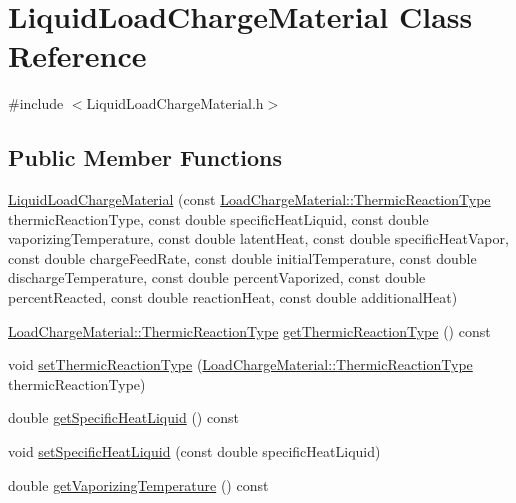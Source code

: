 \hypertarget{class_liquid_load_charge_material}{}\section{Liquid\+Load\+Charge\+Material Class Reference}
\label{class_liquid_load_charge_material}


{\ttfamily \#include $<$Liquid\+Load\+Charge\+Material.\+h$>$}

\subsection*{Public Member Functions}
\begin{DoxyCompactItemize}
\item 
\hyperlink{class_liquid_load_charge_material_ab6b2ef342701227c60dc380f5a576085}{Liquid\+Load\+Charge\+Material} (const \hyperlink{class_load_charge_material_a51d4263e865a5d86236622dd3fe23fd1}{Load\+Charge\+Material\+::\+Thermic\+Reaction\+Type} thermic\+Reaction\+Type, const double specific\+Heat\+Liquid, const double vaporizing\+Temperature, const double latent\+Heat, const double specific\+Heat\+Vapor, const double charge\+Feed\+Rate, const double initial\+Temperature, const double discharge\+Temperature, const double percent\+Vaporized, const double percent\+Reacted, const double reaction\+Heat, const double additional\+Heat)
\item 
\hyperlink{class_load_charge_material_a51d4263e865a5d86236622dd3fe23fd1}{Load\+Charge\+Material\+::\+Thermic\+Reaction\+Type} \hyperlink{class_liquid_load_charge_material_a181337f5e5cf6a47b82dd56897b49c29}{get\+Thermic\+Reaction\+Type} () const
\item 
void \hyperlink{class_liquid_load_charge_material_a39c258d0bfdcfa352590d411a8c4e882}{set\+Thermic\+Reaction\+Type} (\hyperlink{class_load_charge_material_a51d4263e865a5d86236622dd3fe23fd1}{Load\+Charge\+Material\+::\+Thermic\+Reaction\+Type} thermic\+Reaction\+Type)
\item 
double \hyperlink{class_liquid_load_charge_material_aa698f1f73dff91951139a4a50582963d}{get\+Specific\+Heat\+Liquid} () const
\item 
void \hyperlink{class_liquid_load_charge_material_a2187c4c6ba394c05ab42e769bf175683}{set\+Specific\+Heat\+Liquid} (const double specific\+Heat\+Liquid)
\item 
double \hyperlink{class_liquid_load_charge_material_a07004e345fb4ff287d435d0c84027973}{get\+Vaporizing\+Temperature} () const

\end{DoxyCompactItemize}
